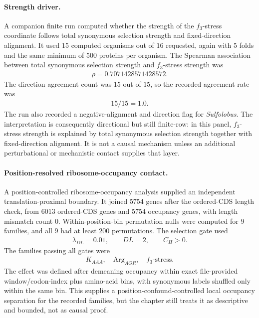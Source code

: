\paragraph{Strength driver.}
A companion finite run computed whether the strength of the $f_3$-stress coordinate follows total synonymous selection strength and fixed-direction alignment.  It used $15$ computed organisms out of $16$ requested, again with $5$ folds and the same minimum of $500$ proteins per organism.  The Spearman association between total synonymous selection strength and $f_3$-stress strength was
$$
\begin{aligned}
\rho = 0.7071428571428572.
\end{aligned}
$$
The direction agreement count was $15$ out of $15$, so the recorded agreement rate was
$$
\begin{aligned}
15/15=1.0.
\end{aligned}
$$
The run also recorded a negative-alignment and direction flag for \emph{Sulfolobus}.  The interpretation is consequently directional but still finite-row: in this panel, $f_3$-stress strength is explained by total synonymous selection strength together with fixed-direction alignment.  It is not a causal mechanism unless an additional perturbational or mechanistic contact supplies that layer.

\paragraph{Position-resolved ribosome-occupancy contact.}
A position-controlled ribosome-occupancy analysis supplied an independent translation-proximal boundary.  It joined $5754$ genes after the ordered-CDS length check, from $6013$ ordered-CDS genes and $5754$ occupancy genes, with length mismatch count $0$.  Within-position-bin permutation nulls were computed for $9$ families, and all $9$ had at least $200$ permutations.  The selection gate used
$$
\begin{aligned}
\lambda_{DL}=0.01,\qquad DL=2,\qquad C_H>0.
\end{aligned}
$$
The families passing all gates were
$$
\begin{aligned}
K_{AAA},\quad \mathrm{Arg}_{AGR},\quad f_3\text{-stress}.
\end{aligned}
$$
The effect was defined after demeaning occupancy within exact file-provided window/codon-index plus amino-acid bins, with synonymous labels shuffled only within the same bin.  This supplies a position-confound-controlled local occupancy separation for the recorded families, but the chapter still treats it as descriptive and bounded, not as causal proof.

